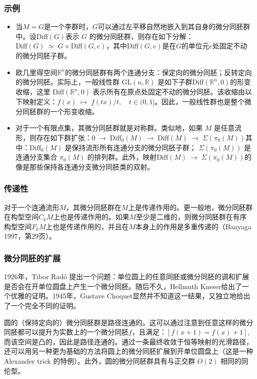 \subsubsection{示例}
\begin{itemize}
\item 当$M = G$是一个李群时，$G$可以通过左平移自然地嵌入到其自身的微分同胚群中。设$\text{Diff}(G)$表示 $G$ 的微分同胚群，则存在如下分解：$\text{Diff}(G) \;\simeq\; G \times \text{Diff}(G, e)$，其中$\text{Diff}(G, e)$是在$G$的单位元$e$处固定不动的微分同胚子群。
\item 欧几里得空间$\mathbb{R}^n$的微分同胚群有两个连通分支：保定向的微分同胚；反转定向的微分同胚。实际上，一般线性群 $\text{GL}(n, \mathbb{R})$ 是如下子群$
\text{Diff}(\mathbb{R}^n, 0)$的形变收缩，这里 $\text{Diff}(\mathbb{R}^n, 0)$ 表示所有在原点处固定不动的微分同胚。该收缩由以下映射定义：$f(x) \;\mapsto\; f(tx)/t, \quad t \in (0, 1]$。因此，一般线性群也是整个微分同胚群的一个形变收缩。
\item 对于一个有限点集，其微分同胚群就是对称群。类似地，如果 $M$ 是任意流形，则存在如下群扩张：$0 \;\longrightarrow\; \text{Diff}_0(M)\;\longrightarrow\; \text{Diff}(M)\;\longrightarrow\; \Sigma(\pi_0(M))$其中：$\text{Diff}_0(M)$ 是保持流形所有连通分支的微分同胚子群；
$\Sigma(\pi_0(M))$ 是连通分支集合 $\pi_0(M)$ 的排列群。此外，映射$\text{Diff}(M) \;\to\; \Sigma(\pi_0(M))$的像是那些保持各连通分支微分同胚类的双射。
\end{itemize}
\subsubsection{传递性}
对于一个连通流形$M$，其微分同胚群在$M$上是传递作用的。更一般地，微分同胚群在构型空间$C_kM$上也是传递作用的。如果$M$至少是二维的，则微分同胚群在有序构型空间$F_kM$上也是传递作用的，并且在$M$本身上的作用是多重传递的（Banyaga 1997，第29页）。
\subsubsection{微分同胚的扩展}
1926年，Tibor Radó 提出一个问题：单位圆上的任意同胚或微分同胚的调和扩展是否会在开单位圆盘上产生一个微分同胚。随后不久，Hellmuth Kneser给出了一个优雅的证明。1945年，Gustave Choquet显然并不知道这一结果，又独立地给出了一个完全不同的证明。

圆的（保持定向的）微分同胚群是路径连通的。这可以通过注意到任意这样的微分同胚都可以提升为实数上的一个微分同胚$f$，且满足：$[f(x+1) = f(x) + 1]$,而该空间是凸的，因此是路径连通的。通过一条最终收敛于恒等映射的光滑路径，还可以用另一种更为基础的方法将圆上的微分同胚扩展到开单位圆盘上（这是一种 Alexander trick 的特例）。此外，圆的微分同胚群具有与正交群 $O(2)$ 相同的同伦型。

